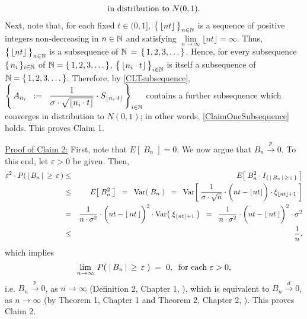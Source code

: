 \begin{enumerate}
\begin{equation}
\begin{array}{l}
		\textnormal{in distribution to $N(0,1)$.}
		\end{array}
		\end{equation}
		Next, note that, for each fixed
		$t \in (0,1]$, $\left\{\,\lfloor \overset{{\color{white}~}}{nt} \rfloor\,\right\}_{n\in\N}$
		is a sequence of positive integers non-decreasing in $n \in \mathbb{N}$ and
		satisfying $\underset{n\rightarrow\infty}{\lim}\lfloor nt \rfloor = \infty$.
		Thus, $\left\{\,\lfloor \overset{{\color{white}~}}{nt} \rfloor\,\right\}_{n\in\N}$ is a
		subsequence of $\mathbb{N} \,=\, \left\{\,1,2,3,\ldots\,\right\}$.
		Hence, for every subsequence $\{\,n_{i}\,\}_{i\in\mathbb{N}}$ of $\mathbb{N} = \{\,1,2,3,\ldots\,\}$,
		$\left\{\,\lfloor \overset{{\color{white}~}}{n_{i}\cdot t} \rfloor\,\right\}_{i\in\N}$
		is itself a subsequence of $\mathbb{N} = \{\,1,2,3,\ldots\,\}$.
		Therefore, by \eqref{CLTsubsequence},
		$
		\left\{\,
		A_{n_{i}}
		\;\; := \;\;
		\dfrac{1}{\sigma\cdot\sqrt{\lfloor n_{i}\cdot t \rfloor}}
		\cdot
		S_{\lfloor n_{i}\cdot t \rfloor}
		\,\right\}_{i \in \mathbb{N}}
		$
		contains a further subsequence which converges in distribution to $N(0,1)$;
		in other words, \eqref{ClaimOneSubsequence} holds.
		This proves Claim 1.
		
		\vskip 0.5cm
		\noindent
		\underline{Proof of Claim 2:}\quad
		First, note that $E\!\left[\;B_{n}\;\right] = 0$.
		We now argue that $B_{n} \overset{p}{\longrightarrow} 0$.
		To this end, let $\varepsilon > 0$ be given.
		Then,
		\begin{eqnarray*}
		\varepsilon^{2} \cdot P\!\left(\,\vert\,B_{n}\,\vert\,\geq\,\varepsilon\,\right)
		&\leq& E\!\left[\;B^{2}_{n} \cdot I_{\{\,\vert\,B_{n}\,\vert\,\geq\,\varepsilon\,\}}\;\right]
		\\
		&\leq& E\!\left[\;B_{n}^{2}\;\right]
		\;\;=\;\; \Var\!\left(\;B_{n}\;\right)
		\;\;=\;\;
			\Var\!\left[\;
				\dfrac{1}{\sigma\cdot\sqrt{n}}
				\cdot
				\left(\overset{{\color{white}1}}{nt} - \lfloor nt \rfloor\right)
				\cdot
				\xi_{\lfloor nt \rfloor + 1}
			\;\right]
		\\
		&=&
			\dfrac{1}{n\cdot\sigma^{2}}
			\cdot
			\left(\overset{{\color{white}1}}{nt} - \lfloor\,nt\,\rfloor\right)^{2}
			\cdot
			\Var\!\left(\;\xi_{\lfloor nt \rfloor + 1}\;\right)
		\;\;=\;\;
			\dfrac{1}{n\cdot\sigma^{2}}
			\cdot
			\left(\overset{{\color{white}1}}{nt} - \lfloor\,nt\,\rfloor\right)^{2}
			\cdot
			\sigma^{2}
		\\
		&\leq& \dfrac{1}{n},
		\end{eqnarray*}
		which implies
		\begin{equation*}
		\lim_{n\rightarrow\infty}\,P\!\left(\;\vert\,B_{n}\,\vert\,\geq\,\varepsilon\;\right) \; = \; 0,
		\;\;
		\textnormal{for each $\varepsilon > 0$},
		\end{equation*}
		i.e. $B_{n}\overset{p}{\longrightarrow}0$, as $n\longrightarrow\infty$
		(Definition 2, Chapter 1, \cite{Ferguson1996}),
		which is equivalent to $B_{n}\overset{d}{\longrightarrow}0$, as $n\longrightarrow\infty$
		(by Theorem 1, Chapter 1 and Theorem 2, Chapter 2, \cite{Ferguson1996}).
		This proves Claim 2.
		

\end{enumerate}

